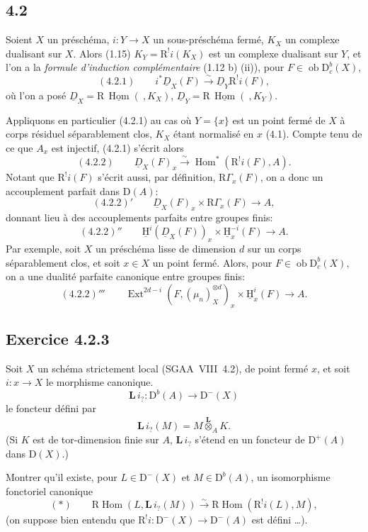 \documentclass[11pt]{article}
\providecommand{\uH}{\underline{\mathrm H}}
\DeclareMathOperator{\Hom}{Hom}
\DeclareMathOperator{\Ext}{Ext}
\newcommand{\R}{\mathrm{R}}\newcommand{\RHomCore}{\mathrm{RHom}}
\newcommand{\D}{\mathrm{D}}
\newcommand{\ob}{\operatorname{ob}}
\providecommand{\Hom}{\operatorname{Hom}}
\providecommand{\ob}{\operatorname{ob}}
\providecommand{\R}{\mathrm R}
\providecommand{\Hom}{\operatorname{Hom}}
\begin{document}
\subsection*{4.2}
Soient $X$ un préschéma, $i:Y\to X$ un sous-préschéma fermé, $K_X$ un complexe dualisant sur $X$. Alors (1.15) $K_Y=\R^{!}i(K_X)$ est un complexe dualisant sur $Y$, et l'on a la \emph{formule d'induction complémentaire} (1.12 b) (ii)), pour $F\in \ob\D_c^b(X)$,
\[
(4.2.1)\qquad i^*\underline{D}_X(F)\xrightarrow{\sim}\underline{D}_Y\R^{!}i(F),
\]
où l'on a posé $\underline{D}_X=\R\,\underline{\Hom}(\ ,K_X)$, $\underline{D}_Y=\R\,\underline{\Hom}(\ ,K_Y)$.

Appliquons en particulier (4.2.1) au cas où $Y=\{x\}$ est un point fermé de $X$ à corps résiduel séparablement clos, $K_X$ étant normalisé en $x$ (4.1). Compte tenu de ce que $A_x$ est injectif, (4.2.1) s'écrit alors
\[
(4.2.2)\qquad \underline{D}_X(F)_x\xrightarrow{\sim}\Hom^*(\R^{!}i(F),A).
\]
Notant que $\R^{!}i(F)$ s'écrit aussi, par définition, $\R\Gamma_x(F)$, on a donc un accouplement parfait dans $\D(A)$:
\[
(4.2.2)'\qquad \underline{D}_X(F)_x\times \R\Gamma_x(F)\longrightarrow A,
\]
donnant lieu à des accouplements parfaits entre groupes finis:
\[
(4.2.2)''\qquad \uH^i(\underline{D}_X(F))_x\times \uH_x^{-i}(F)\longrightarrow A.
\]
Par exemple, soit $X$ un préschéma lisse de dimension $d$ sur un corps séparablement clos, et soit $x\in X$ un point fermé. Alors, pour $F\in\ob\D_c^b(X)$, on a une dualité parfaite canonique entre groupes finis:
\[
(4.2.2)'''\qquad \Ext^{2d-i}(F,(\mu_n)_X^{\otimes d})_x\times \uH_x^i(F)\longrightarrow A.
\]

\subsection*{Exercice 4.2.3}
Soit $X$ un schéma strictement local (SGAA~VIII~4.2), de point fermé $x$, et soit $i:x\to X$ le morphisme canonique.%
\[
\mathbf L\, i_? : \D^b(A)\longrightarrow \D^-(X)
\]
le foncteur défini par
\[
\mathbf L\, i_?(M)=M\overset{\mathbf L}{\otimes}_A K.
\]
(Si $K$ est de tor-dimension finie sur $A$, $\mathbf L\, i_?$ s'étend en un foncteur de $\D^+(A)$ dans $\D(X)$.)

Montrer qu'il existe, pour $L\in\D^-(X)$ et $M\in\D^b(A)$, un isomorphisme fonctoriel canonique
\[
(*)\qquad \R\Hom(L,\mathbf L\, i_?(M))\xrightarrow{\sim}\R\Hom(\R^{!}i(L),M),
\]
(on suppose bien entendu que $\R^{!}i:\D^-(X)\to\D^-(A)$ est défini \dots).
\end{document}
